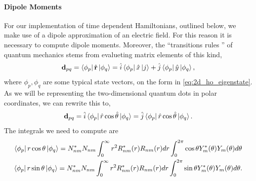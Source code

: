 \paragraph{Dipole Moments}
For our implementation of time dependent Hamiltonians, outlined below, we make use of 
a dipole approximation of an electric field. For this reason it is necessary to compute 
dipole moments. Moreover, the ``transitions rules
'' of quantum mechanics stems from evalueting matrix elements of this kind,
\begin{equation}
    \vb{d}_{pq} = \bra{\phi_p} \hat{\vb{r}} \ket{\phi_q} 
        = \hat{i}\bra{\phi_p} \hat{x} \ket{j} + \hat{j}  \bra{\phi_p} \hat{y} \ket{\phi_q},
\end{equation}
where $\phi_p, \phi_q$ are some typical state vectors, on the form in \autoref{eq:2d_ho_eigenstate}.
As we will be representing the two-dimensional quantum dots in polar coordinates,
we can rewrite this to,
\begin{equation}
    \vb{d}_{pq} 
        = \hat{i}\bra{\phi_p} \hat{r}\cos{\hat{\theta}}\ket{\phi_q}
        = \hat{j}\bra{\phi_p} \hat{r}\cos{\hat{\theta}}\ket{\phi_q}.
\end{equation}
The integrals we need to compute are
\begin{gather}
    \bra{\phi_p} r \cos\theta \ket{\phi_q} 
        = 
        N_{nm}^* N_{nm} 
        \int_0^\infty r^2 R^*_{nm}(r)R_{nm}(r) dr
        \int_0^{2\pi} \cos\theta Y^*_{m}(\theta)Y_{m}(\theta)d\theta \\
    \bra{\phi_p} r \sin\theta \ket{\phi_q} 
        = 
        N_{nm}^* N_{nm} 
        \int_0^\infty r^2 R^*_{nm}(r)R_{nm}(r) dr
        \int_0^{2\pi} \sin\theta Y^*_{m}(\theta)Y_{m}(\theta)d\theta.
\end{gather}


